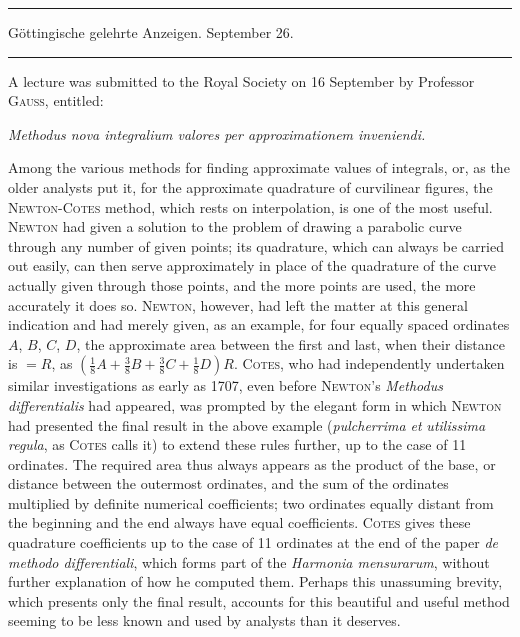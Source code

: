 \par{}\begin{center}
\rule{0.6\linewidth}{0.4pt}\par\medskip
Göttingische gelehrte Anzeigen. September 26.\par\medskip
\rule{0.6\linewidth}{0.4pt}
\end{center}

A lecture was submitted to the Royal Society on 16 September by Professor \textsc{Gauss}, entitled:

\begin{center}
\textit{Methodus nova integralium valores per approximationem inveniendi.}
\end{center}

Among the various methods for finding approximate values of integrals, or, as the older analysts put it, for the approximate quadrature of curvilinear figures, the \textsc{Newton}-\textsc{Cotes} method, which rests on interpolation, is one of the most useful. \textsc{Newton} had given a solution to the problem of drawing a parabolic curve through any number of given points; its quadrature, which can always be carried out easily, can then serve approximately in place of the quadrature of the curve actually given through those points, and the more points are used, the more accurately it does so. \textsc{Newton}, however, had left the matter at this general indication and had merely given, as an example, for four equally spaced ordinates $A$, $B$, $C$, $D$, the approximate area between the first and last, when their distance is $=R$, as $(\frac{1}{8}A+\frac{3}{8}B+\frac{3}{8}C+\frac{1}{8}D)R$. \textsc{Cotes}, who had independently undertaken similar investigations as early as 1707, even before \textsc{Newton}'s \textit{Methodus differentialis} had appeared, was prompted by the elegant form in which \textsc{Newton} had presented the final result in the above example (\textit{pulcherrima et}
\textit{utilissima regula}, as \textsc{Cotes} calls it) to extend these rules further, up to the case of 11 ordinates. The required area thus always appears as the product of the base, or distance between the outermost ordinates, and the sum of the ordinates multiplied by definite numerical coefficients; two ordinates equally distant from the beginning and the end always have equal coefficients. \textsc{Cotes} gives these quadrature coefficients up to the case of 11 ordinates at the end of the paper \textit{de methodo differentiali}, which forms part of the \textit{Harmonia mensurarum}, without further explanation of how he computed them. Perhaps this unassuming brevity, which presents only the final result, accounts for this beautiful and useful method seeming to be less known and used by analysts than it deserves.

